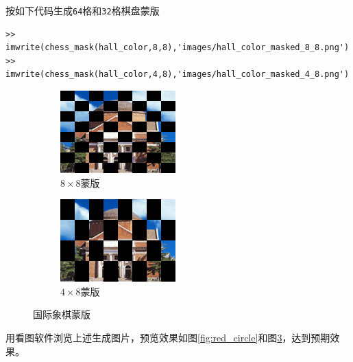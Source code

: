 \documentclass{article}
\numberwithin{figure}{section}
\numberwithin{table}{section}
\numberwithin{listing}{section}
\numberwithin{equation}{section}
\begin{document}
\begin{enumerate}
\begin{enumerate}
                        按如下代码生成\texttt{64}格和\texttt{32}格棋盘蒙版

                        \begin{verbatim}
>> imwrite(chess_mask(hall_color,8,8),'images/hall_color_masked_8_8.png')
>> imwrite(chess_mask(hall_color,4,8),'images/hall_color_masked_4_8.png')
                        \end{verbatim}

                        \begin{figure}[H]
                            \centering
                                \begin{subfigure}{0.5\textwidth}
                                    \centering
                                    \includegraphics[width=0.4\linewidth]{hall_color_masked_8_8}
                                    \caption{$8\times8$蒙版}
                                    \label{fig:hall_color_masked_8_8}
                                \end{subfigure}%
                                \begin{subfigure}{0.5\textwidth}
                                    \centering
                                    \includegraphics[width=0.4\linewidth]{hall_color_masked_4_8}
                                    \caption{$4\times8$蒙版}
                                    \label{fig:hall_color_masked_4_8}
                                \end{subfigure}

                            \caption{国际象棋蒙版}
                            \label{fig:chess_mask}
                        \end{figure}

                \end{enumerate}

                用看图软件浏览上述生成图片，预览效果如图\ref{fig:red_circle}和图\ref{fig:chess_mask}，达到预期效果。

        \end{enumerate}
    
\end{document}
